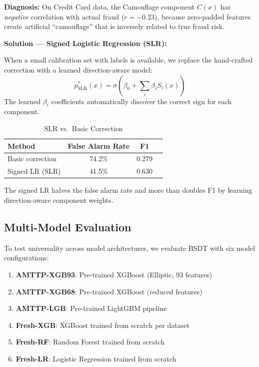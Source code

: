 \documentclass[journal]{IEEEtran}
\begin{document}
\textbf{Diagnosis:} On Credit Card data, the Camouflage component $C(x)$ has \textit{negative} correlation with actual fraud ($r = -0.23$), because zero-padded features create artificial ``camouflage'' that is inversely related to true fraud risk.

\textbf{Solution --- Signed Logistic Regression (SLR):}

When a small calibration set with labels is available, we replace the hand-crafted correction with a learned direction-aware model:
\begin{equation}
  p^*_{\text{SLR}}(x) = \sigma\!\left(\beta_0 + \sum_i \beta_i S_i(x)\right)
  \label{eq:slr}
\end{equation}
The learned $\beta_i$ coefficients automatically discover the correct sign for each component.

\begin{table}[!t]
\centering
\caption{SLR vs.\ Basic Correction}
\label{tab:slr}
\begin{tabular}{@{}lccc@{}}
\toprule
\textbf{Method} & \textbf{False Alarm Rate} & \textbf{F1} \\
\midrule
Basic correction   & 74.2\% & 0.279 \\
Signed LR (SLR)    & 41.5\% & 0.630 \\
\bottomrule
\end{tabular}
\end{table}

The signed LR halves the false alarm rate and more than doubles F1 by learning direction-aware component weights.

\subsection{Multi-Model Evaluation}
\label{ssec:multimodel}

To test universality across model architectures, we evaluate BSDT with six model configurations:

\begin{enumerate}
  \item \textbf{AMTTP-XGB93}: Pre-trained XGBoost (Elliptic, 93 features)
  \item \textbf{AMTTP-XGB68}: Pre-trained XGBoost (reduced features)
  \item \textbf{AMTTP-LGB}: Pre-trained LightGBM pipeline
  \item \textbf{Fresh-XGB}: XGBoost trained from scratch per dataset
  \item \textbf{Fresh-RF}: Random Forest trained from scratch
  \item \textbf{Fresh-LR}: Logistic Regression trained from scratch
\end{enumerate}
\end{document}
